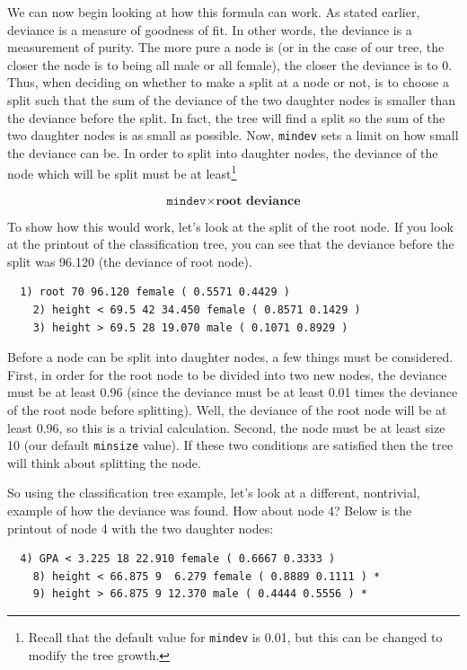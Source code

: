 \documentclass[12pt,twoside]{reedthesis}
\begin{document}
  We can now begin looking at how this formula can work. As stated
  earlier, deviance is a measure of goodness of fit. In other words, the
  deviance is a measurement of purity. The more pure a node is (or in the
  case of our tree, the closer the node is to being all male or all
  female), the closer the deviance is to 0. Thus, when deciding on whether
  to make a split at a node or not, is to choose a split such that the sum
  of the deviance of the two daughter nodes is smaller than the deviance
  before the split. In fact, the tree will find a split so the sum of the
  two daughter nodes is as small as possible. Now, \texttt{mindev} sets a
  limit on how small the deviance can be. In order to split into daughter
  nodes, the deviance of the node which will be split must be at
  least\footnote{Recall that the default value for \texttt{mindev} is
    0.01, but this can be changed to modify the tree growth.}
  
  \[\texttt{mindev}\times\textbf{root deviance}\]
  
  To show how this would work, let's look at the split of the root node.
  If you look at the printout of the classification tree, you can see that
  the deviance before the split was 96.120 (the deviance of root node).
  
  \begin{verbatim}
  1) root 70 96.120 female ( 0.5571 0.4429 )
    2) height < 69.5 42 34.450 female ( 0.8571 0.1429 )
    3) height > 69.5 28 19.070 male ( 0.1071 0.8929 )
  \end{verbatim}
  
  Before a node can be split into daughter nodes, a few things must be
  considered. First, in order for the root node to be divided into two new
  nodes, the deviance must be at least 0.96 (since the deviance must be at
  least 0.01 times the deviance of the root node before splitting). Well,
  the deviance of the root node will be at least 0.96, so this is a
  trivial calculation. Second, the node must be at least size 10 (our
  default \texttt{minsize} value). If these two conditions are satisfied
  then the tree will think about splitting the node.
  
  So using the classification tree example, let's look at a different,
  nontrivial, example of how the deviance was found. How about node 4?
  Below is the printout of node 4 with the two daughter nodes:
  
  \begin{verbatim}
  4) GPA < 3.225 18 22.910 female ( 0.6667 0.3333 )
    8) height < 66.875 9  6.279 female ( 0.8889 0.1111 ) *
    9) height > 66.875 9 12.370 male ( 0.4444 0.5556 ) *
  \end{verbatim}
  
\end{document}
